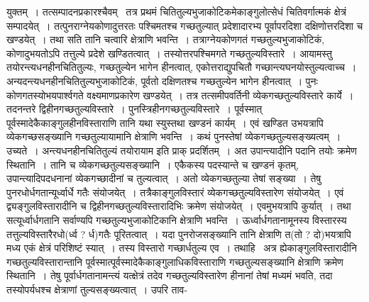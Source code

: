\documentclass[11pt, openany]{book}
\begin{document}
\noindent युक्तम्~। तत्सम्पादनप्रकारश्चैवम् \textendash\ तत्र प्रथमं चितितुल्यभुजाकोटिकमेकाङ्गुलोत्सेधं चितिवर्गात्मकं क्षेत्रं सम्पादयेत्~।
तत्पुनराग्नेयकोणादुत्तरतः पश्चिमतश्च गच्छतुल्यात् प्रदेशादारभ्य पूर्वापरदिशा दक्षिणोत्तरदिशा च खण्डयेत्~। तथा सति तानि चत्वारि क्षेत्राणि भवन्ति~। तत्राग्नेयकोणगतं गच्छतुल्यभुजाकोटिकं, कोणादुभयतोऽपि तत्तुल्ये प्रदेशे खण्डितत्वात्~। तस्योत्तरपश्चिमगते गच्छतुल्यविस्तारे~। आयामस्तु तयोरन्त्यधनहीनचितितुल्यः, गच्छतुल्येन भागेन हीनत्वात्, एकोत्तराद्युपचितौ गच्छान्त्यघनयोस्तुल्यत्वाच्च~। अन्यदन्त्यधनहीनचितितुल्यभुजाकोटिकं, पूर्वतो दक्षिणतश्च गच्छतुल्येन भागेन हीनत्वात्~। पुनः कोणगतस्योभयपार्श्वगते वक्ष्यमाणप्रकारेण खण्डयेत्~। तत्र तत्समीपवर्तिनी व्येकगच्छतुल्यविस्तारे कार्ये~। तदनन्तरे द्विहीनगच्छतुल्यविस्तारे~। पुनस्त्रिहीनगच्छतुल्यविस्तारे~। पूर्वस्मात् पूर्वस्मादेकैकाङ्गुलहीनविस्ताराणि तानि यथा स्युस्तथा खण्डनं कार्यम्~। एवं खण्डित उभयत्रापि व्येकगच्छसङ्ख्यानि गच्छतुल्यायामानि क्षेत्राणि भवन्ति~। कथं पुनस्तेषां व्येकगच्छतुल्यसङ्ख्यत्वम्~। उच्यते~। अन्त्यधनहीनचितितुल्यं तयोरायाम इति प्राक् प्रदर्शितम्~। अत उपान्त्यादीनि पदानि तयोः क्रमेण स्थितानि~। तानि च व्येकगच्छतुल्यसङ्ख्यानि~। एकैकस्य पदस्यान्ते च खण्डनं कृतम्, उपान्त्यादिपदधनानां व्येकगच्छादीनां च तुल्यत्वात्~। अतो व्येकगच्छतुल्या तेषां सङ्ख्या~। तेषु पुनरधोर्धगतान्यूर्ध्वार्धे गतैः संयोजयेत्~। तत्रैकाङ्गुलविस्तारं व्येकगच्छतुल्यविस्तारेण संयोजयेत्~। एवं द्व्यङ्गुलविस्तारादीनि च द्विहीनगच्छतुल्यविस्तारादिभिः क्रमेण संयोजयेत्~। एवमुभयत्रापि कुर्यात्~। तथा सत्यूर्ध्वार्धगतानि सर्वाण्यपि गच्छतुल्यभुजाकोटिकानि क्षेत्राणि भवन्ति~। ऊर्ध्वार्धगतानामूनस्य विस्तारस्य तत्तुल्यविस्तारैरधो(र्ध्व ? र्ध)गतैः पूरितत्वात्~। यदा पुनरोजसङ्ख्यानि तानि क्षेत्राणि त(तो ? दो)भयत्रापि मध्य एकं क्षेत्रं परिशिष्टं स्यात्~। तस्य विस्तारो गच्छार्धतुल्य एव~। तथाहि \textendash\ अत्र ह्येकाङ्गुलविस्तारादीनि गच्छतुल्यविस्तारान्तानि पूर्वस्मात्पूर्वस्मादेकैकाङ्गुलाधिकविस्ताराणि गच्छतुल्यसङ्ख्यानि क्षेत्राणि क्रमेण स्थितानि~। तेषु पूर्वार्धगतानामन्त्यं यत्क्षेत्रं तदेव गच्छतुल्यविस्तारेण हीनानां तेषां मध्यमं भवति, तदा तस्योपर्यधश्च क्षेत्राणां तुल्यसङ्ख्यत्वात्~। उपरि ताव-

\newpage
\end{document}
